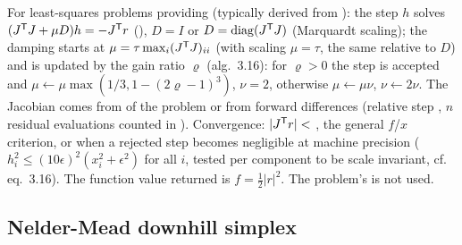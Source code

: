 For least-squares problems providing  (typically derived from ): the step $h$ solves
$(J^{\mathsf T} J+\mu D)h=-J^{\mathsf T} r$ (), $D=I$ or $D=\mathrm{diag}(J^{\mathsf T} J)$ (Marquardt scaling); the damping starts at
$\mu=\tau\max_i(J^{\mathsf T} J)_{ii}$ (with scaling $\mu=\tau$, the same relative to $D$) and is updated by the gain ratio $\varrho$ \cite{optimize:madsen2004} (alg.~3.16): for $\varrho>0$
the step is accepted and $\mu\leftarrow\mu\max(1/3,1-(2\varrho-1)^3)$, $\nu=2$, otherwise $\mu\leftarrow\mu\nu$, $\nu\leftarrow2\nu$.
The Jacobian comes from  of the problem or from forward differences (relative step , $n$
residual evaluations counted in ). Convergence: $|J^{\mathsf T} r|<$ , the general $f$/$x$ criterion, or
when a rejected step becomes negligible at machine precision ($h_i^2\le(10\epsilon)^2(x_i^2+\epsilon^2)$ for all $i$,
tested per component to be scale invariant, cf.\ \cite{optimize:madsen2004} eq.~3.16). The function value returned is
$f=\frac12|r|^2$. The problem's  is not used.
\begin{lareference}
\end{lareference}
\subsection{Nelder-Mead downhill simplex}

